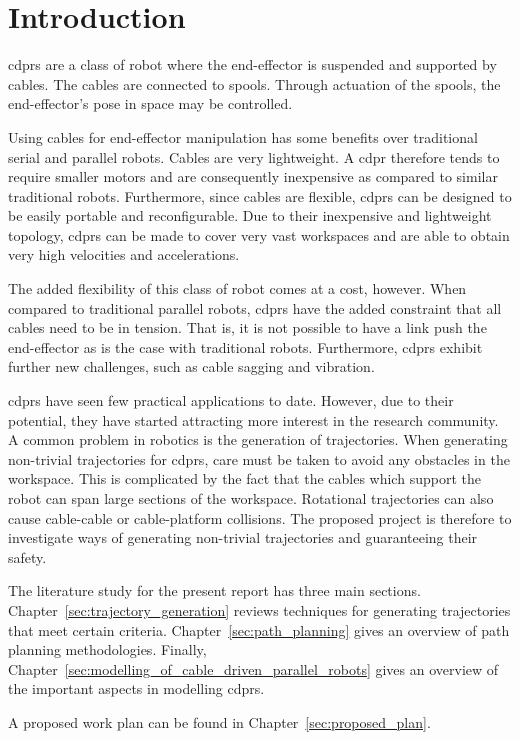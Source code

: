 \chapter{Introduction}%
\label{chap:introduction}

	\glspl{cdpr} are a class of robot where the end-effector is suspended and
	supported by cables. The cables are connected to spools. Through actuation
	of the spools, the end-effector's pose in space may be controlled.

	Using cables for end-effector manipulation has some benefits over
	traditional serial and parallel robots. Cables are very lightweight. A
	\gls{cdpr} therefore tends to require smaller motors and are consequently
	inexpensive as compared to similar traditional robots. Furthermore, since
	cables are flexible, \glspl{cdpr} can be designed to be easily portable and
	reconfigurable. Due to their inexpensive and lightweight topology,
	\glspl{cdpr} can be made to cover very vast workspaces and are able to
	obtain very high velocities and accelerations.

	The added flexibility of this class of robot comes at a cost, however. When
	compared to traditional parallel robots, \glspl{cdpr} have the added
	constraint that all cables need to be in tension. That is, it is not
	possible to have a link push the end-effector as is the case with
	traditional robots. Furthermore, \glspl{cdpr} exhibit further new
	challenges, such as cable sagging and vibration.

	\glspl{cdpr} have seen few practical applications to date. However, due to
	their potential, they have started attracting more interest in the research
	community. A common problem in robotics is the generation of trajectories.
	When generating non-trivial trajectories for \glspl{cdpr}, care must be
	taken to avoid any obstacles in the workspace. This is complicated by the
	fact that the cables which support the robot can span large sections of the
	workspace.  Rotational trajectories can also cause cable-cable or
	cable-platform collisions. The proposed project is therefore to investigate
	ways of generating non-trivial trajectories and guaranteeing their safety.


	The literature study for the present report has three main sections.
	Chapter~\ref{sec:trajectory_generation} reviews techniques for generating
	trajectories that meet certain criteria. Chapter~\ref{sec:path_planning}
	gives an overview of path planning methodologies. Finally,
	Chapter~\ref{sec:modelling_of_cable_driven_parallel_robots} gives an
	overview of the important aspects in modelling \glspl{cdpr}.

	A proposed work plan can be found in Chapter~\ref{sec:proposed_plan}.

